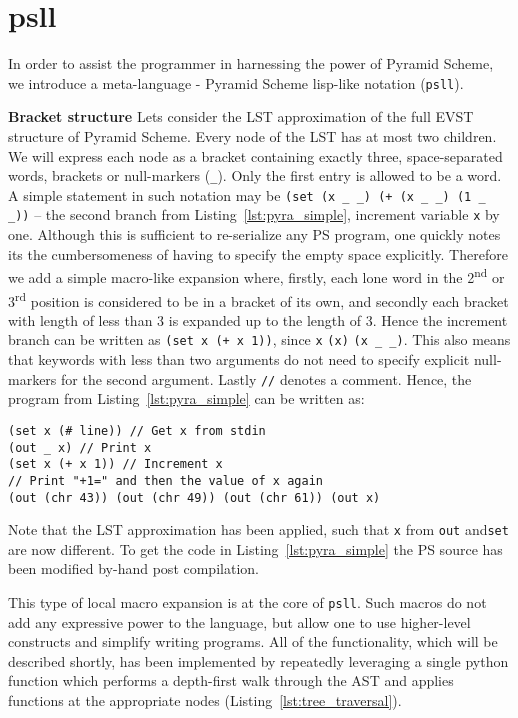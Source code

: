 \documentclass[aip,jcp,reprint,footinbib]{revtex4-1}
\let\tt\texttt
\newcommand\psll{\texttt{psll}\xspace}
\newcommand{\ilpsll}[1]{\lstinline[language=psll,columns=flexible]{#1}}
\begin{document}
\section{psll}

In order to assist the programmer in harnessing the power of Pyramid Scheme, we introduce a meta-language - Pyramid Scheme lisp-like notation (\psll).

\textbf{Bracket structure} Lets consider the LST approximation of the full EVST structure of Pyramid Scheme. Every node of the LST has at most two children. We will express each node as a bracket containing exactly three, space-separated words, brackets or null-markers (\ilpsll{_}). Only the first entry is allowed to be a word. A simple statement in such notation may be \ilpsll{(set (x _ _) (+ (x _ _) (1 _ _))} -- the second branch from Listing~\ref{lst:pyra_simple}, increment variable \tt{x} by one. Although this is sufficient to re-serialize any PS program, one quickly notes its the cumbersomeness of having to specify the empty space explicitly. Therefore we add a simple macro-like expansion where, firstly, each lone word in the 2\textsuperscript{nd} or 3\textsuperscript{rd} position is considered to be in a bracket of its own, and secondly each bracket with length of less than 3 is expanded up to the length of 3. Hence the increment branch can be written as \ilpsll{(set x (+ x 1))}, since \ilpsll{x} \textrightarrow \ilpsll{(x)} \textrightarrow \ilpsll{(x _ _)}. This also means that keywords with less than two arguments do not need to specify explicit null-markers for the second argument. Lastly \tt{//} denotes a comment. Hence, the program from Listing~\ref{lst:pyra_simple} can be written as:
\begin{lstlisting}[language=psll,
    label=lst:psll_simple, caption={
    LST approximation of the program from Listing~\ref{lst:pyra_simple} in simple \psll notation.
}]
(set x (# line)) // Get x from stdin
(out _ x) // Print x
(set x (+ x 1)) // Increment x
// Print "+1=" and then the value of x again
(out (chr 43)) (out (chr 49)) (out (chr 61)) (out x)
\end{lstlisting}
Note that the LST approximation has been applied, such that \tt{x} from \tt{out} and\tt{set} are now different. To get the code in Listing~\ref{lst:pyra_simple} the PS source has been modified by-hand post compilation.

This type of local macro expansion is at the core of \psll. Such macros do not add any expressive power to the language,\cite{krishnamurthi2019} but allow one to use higher-level constructs and simplify writing programs. All of the functionality, which will be described shortly, has been implemented by repeatedly leveraging a single python function which performs a depth-first walk through the AST and applies functions at the appropriate nodes (Listing~\ref{lst:tree_traversal}).
\end{document}
